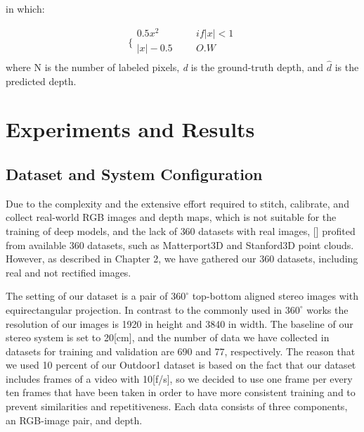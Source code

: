 \documentclass[english, LaM, oneside]{sapthesis}%
\begin{document}
in which:


\begin{equation}\label{eq:loss2}
        \Biggl\{
        \begin{align*}
        0.5x^2&&        &  if |x|<1  \\
        |x| - 0.5 &&      &  O.W   \\    
        \end{align*}
\end{equation}
where N is the number of labeled pixels, \textit{d} is the ground-truth depth, and $\hat{d}$ is the predicted depth\cite{c16}.





\chapter{Experiments and Results }

\section{Dataset and System Configuration}


Due to the complexity and the extensive effort required to stitch, calibrate, and collect real-world RGB images and depth maps, which is not suitable for the training of deep models, and the lack of 360 datasets with real images, [] profited from available 360 datasets, such as Matterport3D  and Stanford3D point clouds. However, as described in Chapter 2, we have gathered our 360 datasets, including real and not rectified images.

The setting of our dataset is a pair of $360^\circ$ top-bottom aligned stereo images with equirectangular projection. In contrast to the commonly used in $360^\circ$ works \cite{ex1,ex2,ex3} the resolution of our images is 1920 in height and 3840 in width. The baseline of our stereo system is set to 20[cm], and the number of data we have collected in datasets for training and validation are 690 and 77, respectively. The reason that we used 10 percent of our Outdoor1 dataset is based on the fact that our dataset includes frames of a video with 10[f/s], so we decided to use one frame per every ten frames that have been taken in order to have more consistent training and to prevent similarities and repetitiveness. Each data consists of three components, an RGB-image pair, and depth. 
\end{document}
